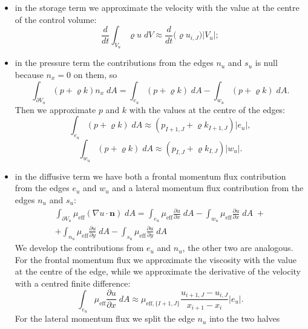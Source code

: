 \begin{itemize}
	\item in the storage term we approximate the velocity with the value at the 
	centre of the control volume:
	\begin{equation}
	\frac{d}{dt} \int_{V_u} \varrho u\; dV \approx \frac{d}{dt} \big( \varrho 
	u_{i,J} \big)|V_u|;
	\end{equation}
	\item in the pressure term the contributions from the edges $n_u$ and $s_u$ 
	is null because $n_x=0$ on them, so 
	\begin{equation}
	\int_{\partial V_u} (p + \varrho k)n_x \; dA = \int_{e_u} (p+\varrho k) \; 
	dA - \int_{w_u} (p+\varrho k) \; dA.
	\end{equation}
	Then we approximate $p$ and $k$ with the values at the centre of the edges:
	\begin{equation}
	\int_{e_u} (p+\varrho k) \; dA \approx (p_{I+1,J} +\varrho k_{I+1,J}) |e_u|,
	\end{equation}
	\begin{equation}
	\int_{w_u} (p+\varrho k) \; dA \approx (p_{I,J} +\varrho k_{I,J}) |w_u|.
	\end{equation}
	\item in the diffusive term we have both a frontal momentum flux 
	contribution from the edges $e_u$ and $w_u$ and a lateral momentum flux 
	contribution from the edges $n_u$ and $s_u$:
	\begin{multline}
	\int_{\partial V_u} \mu_\text{eff} (\nabla u \cdot \mathbf{n}) \; dA =     
	\int_{e_u} \mu_\text{eff} \frac{\partial u}{\partial x} \; dA
	- \int_{w_u} \mu_\text{eff} \frac{\partial u}{\partial x} \; dA \;+\\
	+\int_{n_u} \mu_\text{eff} \frac{\partial u}{\partial y} \; dA
	- \int_{s_u} \mu_\text{eff} \frac{\partial u}{\partial y} \; dA
	\end{multline}
	We develop the contributions from $e_u$ and $n_u$, the other two are 
	analogous.\\	
	For the frontal momentum flux we approximate the viscosity with 
	the value at the centre of the edge, while we approximate the derivative of 
	the velocity with a centred finite difference:
	\begin{equation}
	\int_{e_u} \mu_\text{eff} \frac{\partial u}{\partial x} \; dA \approx 
	\mu_{\text{eff},\{I+1,J\}} \frac{u_{i+1,J} - u_{i,J}}{x_{i+1}-x_i} |e_u|.
	\end{equation}
	For the lateral momentum flux we split the 	edge $n_u$ into the two halves 

\end{itemize}
